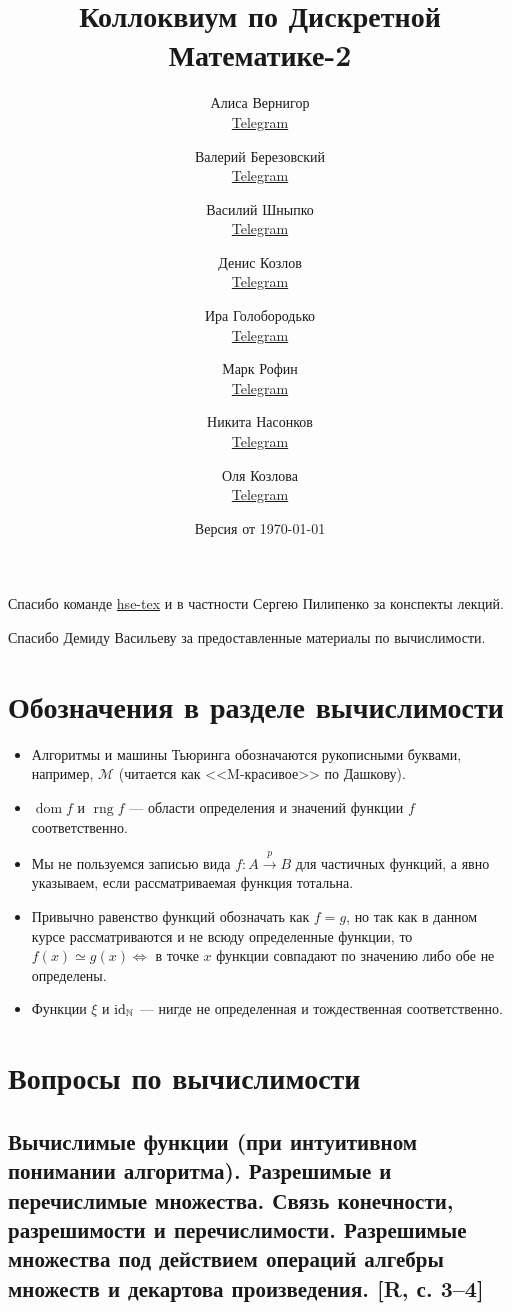 \documentclass[a4paper, fleqn]{article}
\title{Коллоквиум по Дискретной Математике-2}
\author{
    Алиса Вернигор       \\ \href{https://t.me/allisyonok}{Telegram} \and
    Валерий Березовский  \\ \href{https://t.me/jeembogod}{Telegram} \and
    Василий Шныпко       \\ \href{https://t.me/yourvash}{Telegram} \and
    Денис Козлов         \\ \href{https://t.me/DKozl50}{Telegram} \and
    Ира Голобородько     \\ \href{https://t.me/Ira4kgl}{Telegram} \and
    Марк Рофин           \\ \href{https://t.me/Broccoliman}{Telegram} \and
    Никита Насонков      \\ \href{https://t.me/nnv_nick}{Telegram} \and
    Оля Козлова          \\ \href{https://t.me/grenlayk}{Telegram}
}
\date{Версия от {\ddmmyyyydate\today} \currenttime}
\DeclareMathOperator{\dom}{\mathop{\mathrm{dom}}}
\DeclareMathOperator{\rng}{\mathop{\mathrm{rng}}}
\begin{document}
    \maketitle

    Спасибо команде \href{https://github.com/hse-tex/hse-tex}{hse-tex} 
    и в частности Сергею Пилипенко за конспекты лекций. 

    Спасибо Демиду Васильеву за предоставленные материалы по вычислимости.

    \tableofcontents

    \newpage

\section{Обозначения в разделе вычислимости}

    \begin{itemize}
        \item Алгоритмы и машины Тьюринга обозначаются рукописными буквами, например, $\mathcal{M}$ (читается как <<M-красивое>> по Дашкову).

        \item $\dom f$ и $\rng f$ --- области определения и значений функции $f$ соответственно.

        \item Мы не пользуемся записью вида $f : A \xrightarrow{p} B$ для частичных функций, а явно указываем, если рассматриваемая функция тотальна.

        \item Привычно равенство функций обозначать как $f = g$, но так как в данном курсе рассматриваются и не всюду определенные функции, то $f(x) \simeq g(x) \iff$ в точке $x$ функции совпадают по значению либо обе не определены.

        \item Функции $\xi$ и $\text{id}_{\mathbb{N}}$ --- нигде не определенная и тождественная соответственно.
    \end{itemize}

\section{Вопросы по вычислимости}

    \subsection{Вычислимые функции (при интуитивном понимании алгоритма). Разрешимые и перечислимые множества. Связь конечности, разрешимости и перечислимости. Разрешимые множества под действием операций алгебры множеств и декартова произведения. [R, с. 3–4]}
\end{document}
